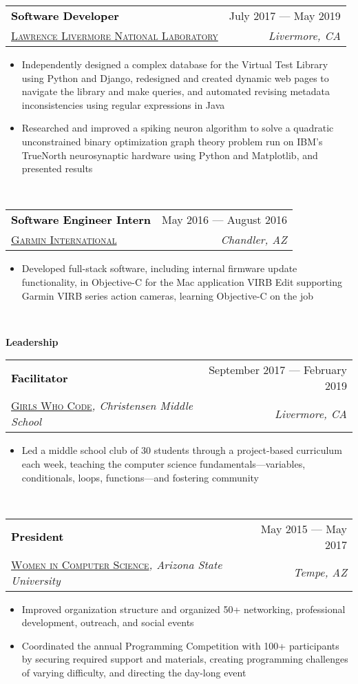 \documentclass[letterpaper,11pt]{article}
\makeatletter
\newcommand{\resumeSpacing}{5pt}
\newcommand{\resumeSection}[1]{
  \begin{flushleft}
  {\LARGE
  \textcolor{accent}{\textbf{#1}}
  \hrulefill}
  \end{flushleft}
}
\newcommand{\resumeSubsection}[6]{
  \begin{center}
  \vspace{-2.5pt}
	\begin{tabular*}{\textwidth}{l@{\extracolsep{\fill}}r}
	\large\textcolor{black}{\textbf{#1}} & \small\textcolor{accent}{#2} \\
  \href{#4}{\textsc{#3}}\textit{#6} & \textit{#5} \\
	\end{tabular*}
  \vspace{-\resumeSpacing}
  \end{center}
}
\newenvironment{resumeItemize}{
  \addtolength{\leftmargini}{-\resumeSpacing}
  \begin{minipage}{0.99\textwidth}
  \begin{itemize}
  \small
}{
  \end{itemize}
  \vspace{0pt}
  \end{minipage}
  \normalsize
  \ \\
}
\newcommand{\resumeItem}[1]
{
  \item{#1}
  \vspace{-\resumeSpacing}
}
\makeatother
\begin{document}
  \resumeSubsection
  {Software Developer}{July 2017 --- May 2019}
  {Lawrence Livermore National Laboratory}{https://www.llnl.gov/}{Livermore, CA}{}
  \begin{resumeItemize}
	  \resumeItem
    {Independently designed a complex database for the Virtual Test Library using Python and Django, redesigned and created dynamic web pages to navigate the library and make queries, and automated revising metadata inconsistencies using regular expressions in Java}
	  \resumeItem
	  {Researched and improved a spiking neuron algorithm to solve a quadratic unconstrained binary optimization graph theory problem run on IBM's TrueNorth neurosynaptic hardware using Python and Matplotlib, and presented results}
  \end{resumeItemize}
	\resumeSubsection
  {Software Engineer Intern}{May 2016 --- August 2016}
  {Garmin International}{https://www.garmin.com/}{Chandler, AZ}{}
	\begin{resumeItemize}
	\resumeItem
	{Developed full-stack software, including internal firmware update functionality, in Objective-C for the Mac application VIRB Edit supporting Garmin VIRB series action cameras, learning Objective-C on the job}
	\end{resumeItemize}
  \resumeSection{Leadership}
  \resumeSubsection
  {Facilitator}{September 2017 --- February 2019}
  {Girls Who Code}{https://girlswhocode.com/}{Livermore, CA}{, Christensen Middle School}
  \begin{resumeItemize}
  \resumeItem
    {Led a middle school club of 30 students through a project-based curriculum each week, teaching the computer science fundamentals---variables, conditionals, loops, functions---and fostering community}
  \end{resumeItemize}
  \resumeSubsection
  {President}{May 2015 --- May 2017}
  {Women in Computer Science}{http://wics-asu.org/}{Tempe, AZ}{, Arizona State University}
  \begin{resumeItemize}
	  \resumeItem
    {Improved organization structure and organized 50+ networking, professional development, outreach, and social events}
	  \resumeItem
    {Coordinated the annual Programming Competition with 100+ participants by securing required support and materials, creating programming challenges of varying difficulty, and directing the day-long event}
  \end{resumeItemize}
\end{document}
